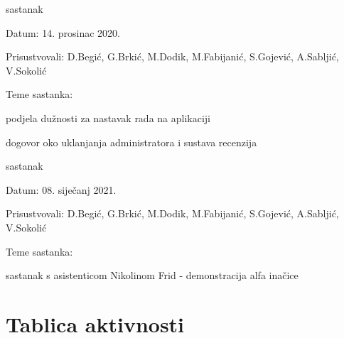 \begin{packed_enum}
			\item  sastanak
			\item[] \begin{packed_item}
				\item Datum: 14. prosinac 2020.
				\item Prisustvovali: D.Begić, G.Brkić, M.Dodik, M.Fabijanić, S.Gojević, A.Sabljić, V.Sokolić
				\item Teme sastanka:
				\begin{packed_item}
					\item  podjela dužnosti za nastavak rada na aplikaciji
					\item  dogovor oko uklanjanja administratora i sustava recenzija 
				\end{packed_item}
			\end{packed_item}
			\item  sastanak
			\item[] \begin{packed_item}
				\item Datum: 08. siječanj 2021.
				\item Prisustvovali: D.Begić, G.Brkić, M.Dodik, M.Fabijanić, S.Gojević, A.Sabljić, V.Sokolić
				\item Teme sastanka:
				\begin{packed_item}
					\item  sastanak s asistenticom Nikolinom Frid - demonstracija alfa inačice 
				\end{packed_item}
			\end{packed_item}
			
		\end{packed_enum}
		
		\eject
		\section*{Tablica aktivnosti}
	
